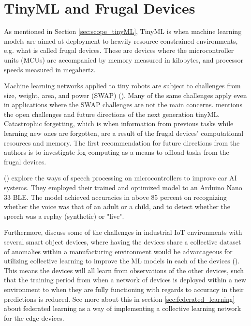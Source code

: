 \section{TinyML and Frugal Devices}
\label{app:tinyML}
As mentioned in Section \ref{sec:scope_tinyML}, TinyML is when machine learning models are aimed at deployment to heavily resource constrained environments, e.g. what is called frugal devices. These are devices where the microcontroller units (MCUs) are accompanied by memory measured in kilobytes, and processor speeds measured in megahertz. 

Machine learning networks applied to tiny robots are subject to challenges from size, weight, area, and power (SWAP) (\cite{ne2022robotstinymlconstraints}). Many of the same challenges apply even in applications where the SWAP challenges are not the main concerns. \citeauthor{ra2023reformabletinyml} mentions the open challenges and future directions of the next generation tinyML. Catastrophic forgetting, which is when information from previous tasks while learning new ones are forgotten, are a result of the frugal devices' computational resources and memory. The first recommendation for future directions from the authors is to investigate fog computing as a means to offload tasks from the frugal devices.

\citeauthor{ma2023tinyML_speech_recognition} (\citeyear{ma2023tinyML_speech_recognition}) explore the ways of speech processing on microcontrollers to improve car AI systems. They employed their trained and optimized model to an Arduino Nano 33 BLE. The model achieved accuracies in above 85 percent on recognizing whether the voice was that of an adult or a child, and to detect whether the speech was a replay (synthetic) or "live". 

Furthermore, \citeauthor{ra2023reformabletinyml} discuss some of the challenges in industrial IoT environments with several smart object devices, where having the devices share a collective dataset of anomalies within a manufacturing environment would be advantageous for utilizing collective learning to improve the ML models in each of the devices (\citeyear{ra2023reformabletinyml}). This means the devices will all learn from observations of the other devices, such that the training period from when a network of devices is deployed within a new environment to when they are fully functioning with regards to accuracy in their predictions is reduced. See more about this in section \ref{sec:federated_learning} about federated learning as a way of implementing a collective learning network for the edge devices.
